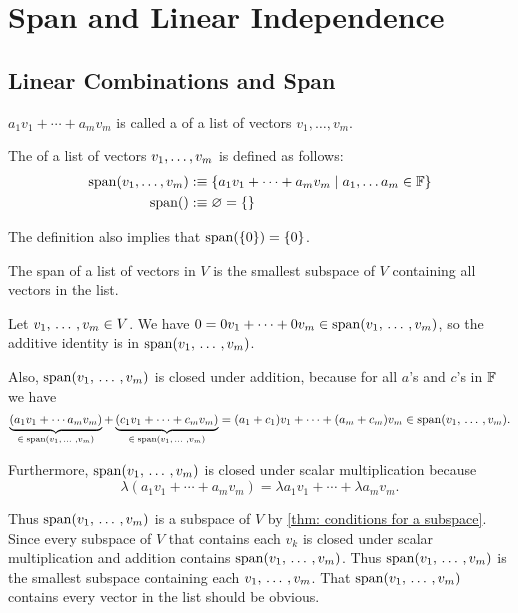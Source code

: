 \section{Span and Linear Independence}
\subsection{Linear Combinations and Span}

\setcounter{thm}{1}
\begin{mydef} 
  $a_1 v_1 + \cdots + a_m v_m$ is called a  of a list of vectors $v_1, \dots, v_m$.
\end{mydef}

\setcounter{thm}{3}
\begin{mydef} 
	The  of a list of vectors $v_1, \dots, v_m$ is defined as follows:
  \begin{equation}
    \begin{aligned}
      \operatorname{span} (v_1, \dots, v_m) &:\equiv \{a_1 v_1 + \cdots + a_m v_m \mid a_1, \dots a_m \in \mathbb{F} \}\\
      \operatorname{span} ( ) &:\equiv \varnothing =\{ \}
    \end{aligned}
  \end{equation}

  The definition also implies that $\operatorname{span} ( \{0\}) = \{0\}$.
\end{mydef}

\begin{thm} 
  \label{thm: the span of a list of vectors is a subspace}
  The  span of a list of vectors in $V$ is the smallest subspace of $V$ containing all vectors in the list.
\end{thm}
\begin{prf}
  Let $v_1, {\, \ldots \,\,}, v_m \in V$. We have $0 = 0v_1 + \cdots + 0v_m \in \operatorname{span} (v_1, {\, \ldots \,\,}, v_m)$, so the additive identity is in $\operatorname{span} (v_1, {\, \ldots \,\,}, v_m)$.

  Also, $\operatorname{span} (v_1, {\, \ldots \,\,}, v_m)$ is closed under addition, because for all $a$'s and $c$'s in $\mathbb{F}$ we have
  \[
    \underbrace{(a_1 v_1 + \cdots a_m v_m)}_{\in \; \operatorname{span} (v_1, {\, \ldots \,\,}, v_m)} + \underbrace{(c_1 v_1 + \cdots + c_m v_m)}_{\in \; \operatorname{span} (v_1, {\, \ldots \,\,}, v_m)} = (a_1 + c_1)v_1 + \cdots + (a_m + c_m)v_m \in \operatorname{span} (v_1, {\, \ldots \,\,}, v_m).
  \]

  Furthermore, $\operatorname{span} (v_1, {\, \ldots \,\,}, v_m)$ is closed under scalar multiplication because
  \[
    \lambda (a_1 v_1 + \cdots + a_m v_m) = \lambda a_1 v_1 + \cdots + \lambda a_m v_m.
  \]

  Thus $\operatorname{span} (v_1, {\, \ldots \,\,}, v_m)$ is a subspace of $V$ by \ref{thm: conditions for a subspace}. Since every subspace of $V$ that contains each $v_k$ is closed under scalar multiplication and addition contains $\operatorname{span} (v_1, {\, \ldots \,\,}, v_m)$. Thus $\operatorname{span} (v_1, {\, \ldots \,\,}, v_m)$ is the smallest subspace containing each $v_1, {\, \ldots \,\,}, v_m$. That $\operatorname{span} (v_1, {\, \ldots \,\,}, v_m)$ contains every vector in the list should be obvious.
\end{prf}


